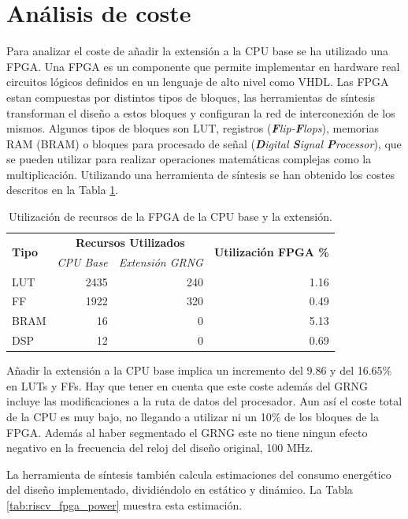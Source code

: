 \section{Análisis de coste}

Para analizar el coste de añadir la extensión a la CPU base se ha utilizado una FPGA. Una FPGA es un componente que permite implementar en hardware real circuitos lógicos definidos en un lenguaje de alto nivel como VHDL. Las FPGA estan compuestas por distintos tipos de bloques, las herramientas de síntesis transforman el diseño a estos bloques y configuran la red de interconexión de los mismos. Algunos tipos de bloques son LUT, registros (\textit{\textbf{F}lip-\textbf{F}lops}), memorias RAM (BRAM) o bloques para procesado de señal (\textit{\textbf{D}igital \textbf{S}ignal \textbf{P}rocessor}), que se pueden utilizar para realizar operaciones matemáticas complejas como la multiplicación. Utilizando una herramienta de síntesis se han obtenido los costes descritos en la Tabla \ref{tab:riscv_fpga_utilization}.

\begin{table}[h]
\centering
\caption{Utilización de recursos de la FPGA de la CPU base y la extensión.}
\label{tab:riscv_fpga_utilization}
\begin{tabular}{lrrr}
\hline
\multirow{2}{*}{\textbf{Tipo}} & \multicolumn{2}{c}{\textbf{Recursos Utilizados}} & \multirow{2}{*}{\textbf{Utilización FPGA \%}}\\
 & \textit{CPU Base} & \textit{Extensión GRNG} & \\ \hline
LUT	        & 2435 & 240 & 1.16 \\
FF	        & 1922 & 320 & 0.49 \\
BRAM	    & 16   & 0 & 5.13 \\
DSP	        & 12   & 0 & 0.69 \\ \hline
\end{tabular}
\end{table}

Añadir la extensión a la CPU base implica un incremento del 9.86 y del 16.65\% en LUTs y FFs. Hay que tener en cuenta que este coste además del GRNG incluye las modificaciones a la ruta de datos del procesador. Aun así el coste total de la CPU es muy bajo, no llegando a utilizar ni un 10\% de los bloques de la FPGA. Además al haber segmentado el GRNG este no tiene ningun efecto negativo en la frecuencia del reloj del diseño original, 100 MHz.

La herramienta de síntesis también calcula estimaciones del consumo energético del diseño implementado, dividiéndolo en estático y dinámico. La Tabla \ref{tab:riscv_fpga_power} muestra esta estimación. 

